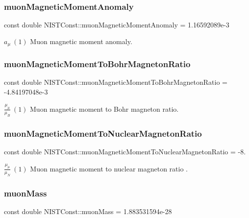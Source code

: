 \subsubsection{\texorpdfstring{muon\+Magnetic\+Moment\+Anomaly}{muonMagneticMomentAnomaly}}
{\footnotesize\ttfamily const double N\+I\+S\+T\+Const\+::muon\+Magnetic\+Moment\+Anomaly = 1.\+16592089e-\/3}

$a_\mu \ (1)$ Muon magnetic moment anomaly. \mbox{\label{group___muon_ga417520e932b056d62595de6d9a75be3e}} 
\subsubsection{\texorpdfstring{muon\+Magnetic\+Moment\+To\+Bohr\+Magneton\+Ratio}{muonMagneticMomentToBohrMagnetonRatio}}
{\footnotesize\ttfamily const double N\+I\+S\+T\+Const\+::muon\+Magnetic\+Moment\+To\+Bohr\+Magneton\+Ratio = -\/4.\+84197048e-\/3}

$\frac{\mu_\mu}{\mu_B} \ (1)$ Muon magnetic moment to Bohr magneton ratio. \mbox{\label{group___muon_gac809a61292c5b8c5fe4679bd944729d8}} 
\subsubsection{\texorpdfstring{muon\+Magnetic\+Moment\+To\+Nuclear\+Magneton\+Ratio}{muonMagneticMomentToNuclearMagnetonRatio}}
{\footnotesize\ttfamily const double N\+I\+S\+T\+Const\+::muon\+Magnetic\+Moment\+To\+Nuclear\+Magneton\+Ratio = -\/8.}

$\frac{\mu_\mu}{\mu_N} \ (1)$ Muon magnetic moment to nuclear magneton ratio . \mbox{\label{group___muon_ga4fed15b8e94009be07c0a5f17af9ffb8}} 
\subsubsection{\texorpdfstring{muon\+Mass}{muonMass}}
{\footnotesize\ttfamily const double N\+I\+S\+T\+Const\+::muon\+Mass = 1.\+883531594e-\/28}

